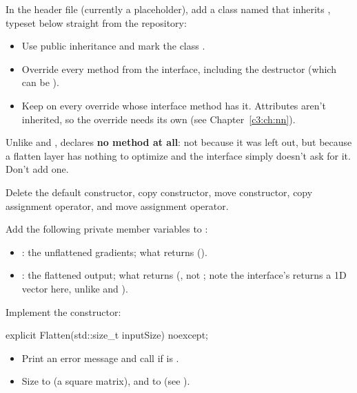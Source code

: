 \label{c10:ex:1}
In the header file  (currently a placeholder), add a
class named  that inherits , typeset below
straight from the repository:
\begin{itemize}
  \item Use public inheritance and mark the class .
  \item Override every method from the interface, including the destructor (which can be
    ).
  \item Keep \code{[[nodiscard]]} on every override whose interface method has it. Attributes
    aren't inherited, so the override needs its own (see Chapter~\ref{c3:ch:nn}).
\end{itemize}


\note Unlike  and ,  declares \textbf{no
 method at all}: not because it was left out, but because a flatten layer has
nothing to optimize and the interface simply doesn't ask for it. Don't add one.

\label{c10:ex:2}
Delete the default constructor, copy constructor, move constructor, copy assignment operator, and
move assignment operator.

\label{c10:ex:3}
Add the following private member variables to :
\begin{itemize}
  \item \textbf{}: the unflattened gradients; what 
    returns ().
  \item \textbf{}: the flattened output; what  returns
    (, not ; note the interface's  returns a 1D vector
    here, unlike  and ).
\end{itemize}

\label{c10:ex:4}
Implement the constructor:

\begin{cppcode}
explicit Flatten(std::size_t inputSize) noexcept;
\end{cppcode}

\begin{itemize}
  \item Print an error message and call  if  is .
  \item Size  to  (a square 
    matrix), and  to  (see ).
\end{itemize}

